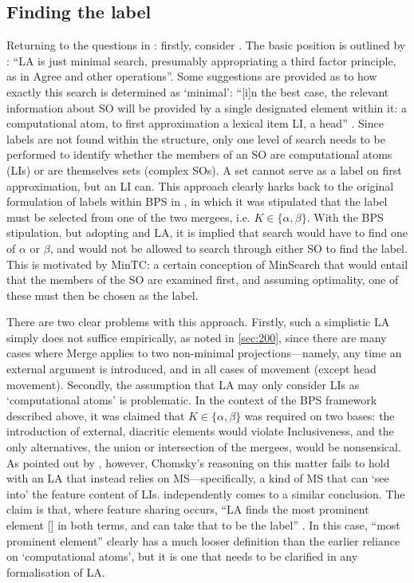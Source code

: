 \subsection{Finding the label}\label{sec:320}

Returning to the questions in : firstly, consider . The basic position is outlined by \textcite[43]{ChomskyN_2013}: ``LA is just minimal search, presumably appropriating a third factor principle, as in Agree and other operations''. Some suggestions are provided as to how exactly this search is determined as `minimal': ``[i]n the best case, the relevant information about SO will be provided by a single designated element within it: a computational atom, to first approximation a lexical item LI, a head'' \parencite[43]{ChomskyN_2013}. Since labels are not found within the structure, only one level of search needs to be performed to identify whether the members of an SO are computational atoms (LIs) or are themselves sets (complex SOs). A set cannot serve as a label on first approximation, but an LI can. This approach clearly harks back to the original formulation of labels within BPS in \textcite{ChomskyN_1994}, in which it was stipulated that the label must be selected from one of the two mergees, i.e. $K\in\{\alpha,\beta\}$. With the BPS stipulation, but adopting  and LA, it is implied that search would have to find one of $\alpha$ or $\beta$, and would not be allowed to search through either SO to find the label. This is motivated by MinTC: a certain conception of MinSearch that would entail that the members of the SO are examined first, and assuming optimality, one of these must then be chosen as the label.

There are two clear problems with this approach. Firstly, such a simplistic LA simply does not suffice empirically, as noted in \autoref{sec:200}, since there are many cases where Merge applies to two non-minimal projections---namely, any time an external argument is introduced, and in all cases of movement (except head movement). Secondly, the assumption that LA may only consider LIs as `computational atoms' is problematic. In the context of the BPS framework described above, it was claimed that $K\in\{\alpha,\beta\}$ was required on two bases: the introduction of external, diacritic elements would violate Inclusiveness, and the only alternatives, the union or intersection of the mergees, would be nonsensical. As pointed out by \textcite{BlumelA_2017a}, however, Chomsky's reasoning on this matter fails to hold with an LA that instead relies on MS---specifically, a kind of MS that can `see into' the feature content of LIs. \textcite{ChomskyN_2013} independently comes to a similar conclusion. The claim is that, where feature sharing occurs, ``LA finds the most prominent element [] in both terms, and can take that to be the label'' \parencite[45]{ChomskyN_2013}. In this case, ``most prominent element'' clearly has a much looser definition than the earlier reliance on `computational atoms', but it is one that needs to be clarified in any formalisation of LA.

